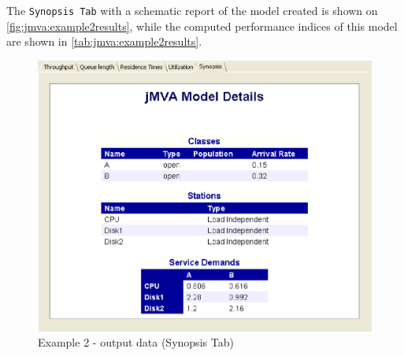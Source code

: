 The \texttt{Synopsis Tab} with a schematic report of the model
created is shown on \autoref{fig:jmva:example2results}, while the
computed performance indices of this model are shown in
\autoref{tab:jmva:example2results}.

\begin{figure}[htbp]
    \begin{center}
        \includegraphics[scale=.5]{img/jmva/example2results}
    \end{center}
    \caption{Example 2 - output data (Synopsis Tab)}
    \label{fig:jmva:example2results}
\end{figure}

